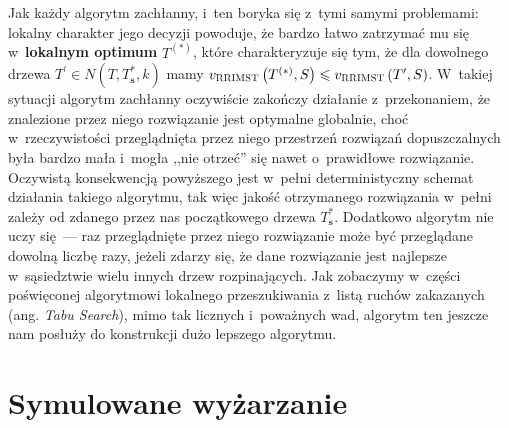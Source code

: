 Jak każdy algorytm zachłanny, i~ten boryka się z~tymi samymi problemami: lokalny charakter jego decyzji powoduje, że bardzo łatwo zatrzymać mu się w~\textbf{lokalnym optimum} $T^{\left( \ast \right)}$, które charakteryzuje się tym, że dla dowolnego drzewa $T^{\prime} \in N \left( T, T^{\ast}_{\textbf{s}}, k \right)$ mamy $v_{\textsc{RRIMST}} \left( T^{\left( \ast \right)}, S \right) \leqslant v_{\textsc{RRIMST}} \left( T^{\prime}, S \right)$.
W~takiej sytuacji algorytm zachłanny oczywiście zakończy działanie z~przekonaniem, że znalezione przez niego rozwiązanie jest optymalne globalnie, choć w~rzeczywistości przeglądnięta przez niego przestrzeń rozwiązań dopuszczalnych była bardzo mała i~mogła ,,nie otrzeć'' się nawet o~prawidłowe rozwiązanie.
Oczywistą konsekwencją powyższego jest w~pełni deterministyczny schemat działania takiego algorytmu, tak więc jakość otrzymanego rozwiązania w~pełni zależy od zdanego przez nas początkowego drzewa $T^{\ast}_{\textbf{s}}$.
Dodatkowo algorytm nie uczy się~--- raz przeglądnięte przez niego rozwiązanie może być przeglądane dowolną liczbę razy, jeżeli zdarzy się, że dane rozwiązanie jest najlepsze w~sąsiedztwie wielu innych drzew rozpinających.
Jak zobaczymy w~części poświęconej algorytmowi lokalnego przeszukiwania z~listą ruchów zakazanych (ang. \textit{Tabu Search}), mimo tak licznych i~poważnych wad, algorytm ten jeszcze nam posłuży do konstrukcji dużo lepszego algorytmu.




\section{Symulowane wyżarzanie}




